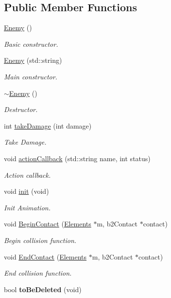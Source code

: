 \subsection*{Public Member Functions}
\begin{DoxyCompactItemize}
\item 
\hyperlink{class_enemy_a94f30d348b6d2840fd71675472ba38dd}{Enemy} ()
\begin{DoxyCompactList}\small\item\em Basic constructor. \end{DoxyCompactList}\item 
\hyperlink{class_enemy_a258ddb71f2f298663dc1ff988dcfd2e2}{Enemy} (std\+::string)
\begin{DoxyCompactList}\small\item\em Main constructor. \end{DoxyCompactList}\item 
\hyperlink{class_enemy_ac0eec4755e28c02688065f9657150ac3}{$\sim$\+Enemy} ()
\begin{DoxyCompactList}\small\item\em Destructor. \end{DoxyCompactList}\item 
int \hyperlink{class_enemy_ae4335909ac929e5e5db7eb01b15fbce8}{take\+Damage} (int damage)
\begin{DoxyCompactList}\small\item\em Take Damage. \end{DoxyCompactList}\item 
void \hyperlink{class_enemy_a2f1157b7c8d74371c2b06493563423ee}{action\+Callback} (std\+::string name, int status)
\begin{DoxyCompactList}\small\item\em Action callback. \end{DoxyCompactList}\item 
void \hyperlink{class_enemy_a4ed496f92f8c791133494d24b4eeaff6}{init} (void)
\begin{DoxyCompactList}\small\item\em Init Animation. \end{DoxyCompactList}\item 
void \hyperlink{class_enemy_a3938e3e2cf5f07d809e1f1927b09539a}{Begin\+Contact} (\hyperlink{class_elements}{Elements} $\ast$m, b2\+Contact $\ast$contact)
\begin{DoxyCompactList}\small\item\em Begin collision function. \end{DoxyCompactList}\item 
void \hyperlink{class_enemy_ad67767dc83c2d22abbdc5f5e2455e4fc}{End\+Contact} (\hyperlink{class_elements}{Elements} $\ast$m, b2\+Contact $\ast$contact)
\begin{DoxyCompactList}\small\item\em End collision function. \end{DoxyCompactList}\item 
\hypertarget{class_enemy_abf7de128f98e8a047f163be2f6910404}{bool {\bfseries to\+Be\+Deleted} (void)}\label{class_enemy_abf7de128f98e8a047f163be2f6910404}


\end{DoxyCompactItemize}
